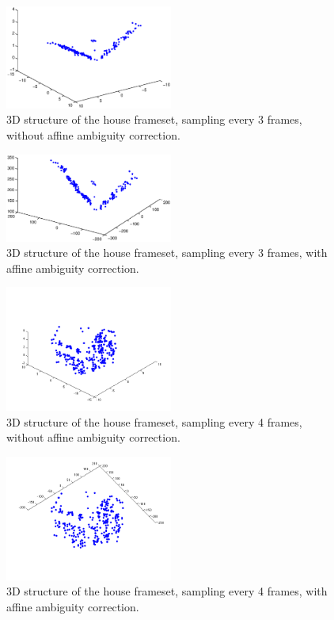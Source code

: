 \begin{figure}[ht!]
  \centering
    \includegraphics[width=0.49\textwidth]{figures/housegood.eps}
    \caption{3D structure of the house frameset, sampling every 3 frames, without affine ambiguity correction.}
    \label{fig:icp3}
\end{figure}


\begin{figure}[ht!]
  \centering
    \includegraphics[width=0.49\textwidth]{figures/housegoodaffine.eps}
    \caption{3D structure of the house frameset, sampling every 3 frames, with affine ambiguity correction.}
    \label{fig:icp3aff}
\end{figure}



\begin{figure}[ht!]
  \centering
    \includegraphics[width=0.49\textwidth]{figures/icp4-11-Amb.png}
    \caption{3D structure of the house frameset, sampling every 4 frames, without affine ambiguity correction.}
    \label{fig:icp4-11-Amb}
\end{figure}

\begin{figure}[ht!]
  \centering
    \includegraphics[width=0.49\textwidth]{figures/icp4-11.png}
    \caption{3D structure of the house frameset, sampling every 4 frames, with affine ambiguity correction.}
    \label{fig:icp4-11}
\end{figure}

